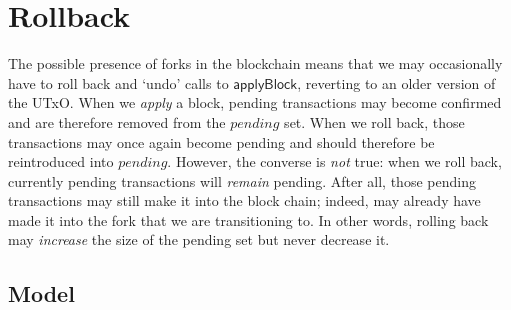 \documentclass{article}
\theoremstyle{definition}{
  \newtheorem{lemma}{Lemma}[section] %
  \newtheorem{definition}[lemma]{Definition}
}
\theoremstyle{theorem}{
  \newtheorem{invariant}[lemma]{Invariant}
  \newtheorem{proofobligation}[lemma]{Proof Obligation}
}
\numberwithin{equation}{lemma}
\begin{document}
\section{Rollback}
\label{sec:rollback}

The possible presence of forks in the blockchain means that we may occasionally
have to roll back and `undo' calls to $\mathsf{applyBlock}$, reverting to an
older version of the UTxO. When we \emph{apply} a block, pending transactions
may become confirmed and are therefore removed from the $\mathit{pending}$ set.
When we roll back, those transactions may once again become pending and should
therefore be reintroduced into $\mathit{pending}$. However, the converse is
\emph{not} true: when we roll back, currently pending transactions will
\emph{remain} pending. After all, those pending transactions may still make it
into the block chain; indeed, may already have made it into the fork that we are
transitioning to. In other words, rolling back may \emph{increase} the size of
the pending set but never decrease it.

\subsection{Model}
\end{document}
